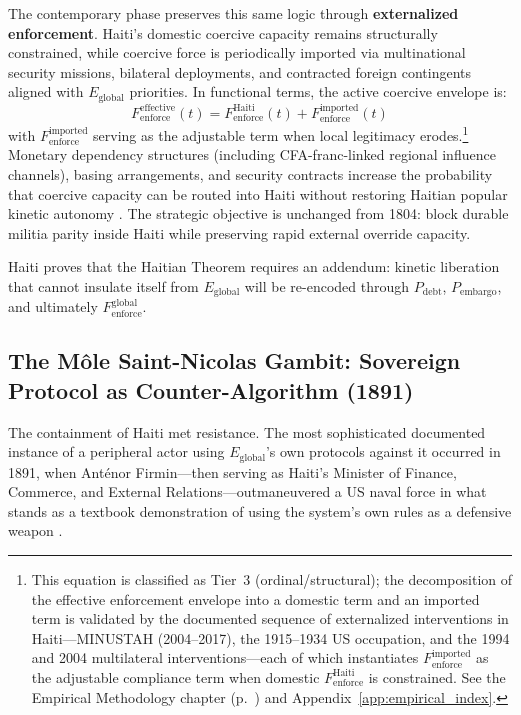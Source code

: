 The contemporary phase preserves this same logic through \textbf{externalized enforcement}. Haiti's domestic coercive capacity remains structurally constrained, while coercive force is periodically imported via multinational security missions, bilateral deployments, and contracted foreign contingents aligned with $E_{\text{global}}$ priorities. In functional terms, the active coercive envelope is:
\begin{equation}\label{eq:13.3-externalized-enforcement-envelope}
F_{\text{enforce}}^{\text{effective}}(t)=F_{\text{enforce}}^{\text{Haiti}}(t)+F_{\text{enforce}}^{\text{imported}}(t)
\end{equation}
with $F_{\text{enforce}}^{\text{imported}}$ serving as the adjustable term when local legitimacy erodes.\footnote{This equation is classified as Tier~3 (ordinal/structural); the decomposition of the effective enforcement envelope into a domestic term and an imported term is validated by the documented sequence of externalized interventions in Haiti---MINUSTAH (2004--2017), the 1915--1934 US occupation, and the 1994 and 2004 multilateral interventions---each of which instantiates $F_{\text{enforce}}^{\text{imported}}$ as the adjustable compliance term when domestic $F_{\text{enforce}}^{\text{Haiti}}$ is constrained. See the Empirical Methodology chapter (p.~\pageref{ch:empirical_methodology}) and Appendix~\ref{app:empirical_index}.} Monetary dependency structures (including CFA-franc-linked regional influence channels), basing arrangements, and security contracts increase the probability that coercive capacity can be routed into Haiti without restoring Haitian popular kinetic autonomy \cite{pigeaud}. The strategic objective is unchanged from 1804: block durable militia parity inside Haiti while preserving rapid external override capacity.

Haiti proves that the Haitian Theorem requires an addendum: kinetic liberation that cannot insulate itself from $E_{\text{global}}$ will be re-encoded through $P_{\text{debt}}$, $P_{\text{embargo}}$, and ultimately $F_{\text{enforce}}^{\text{global}}$.

\subsection{The Môle Saint-Nicolas Gambit: Sovereign Protocol as Counter-Algorithm (1891)}

The containment of Haiti met resistance. The most sophisticated documented instance of a peripheral actor using $E_{\text{global}}$'s own protocols against it occurred in 1891, when Ant\'{e}nor Firmin---then serving as Haiti's Minister of Finance, Commerce, and External Relations---outmaneuvered a US naval force in what stands as a textbook demonstration of using the system's own rules as a defensive weapon \cite{firmin_legacy, manigat}.

